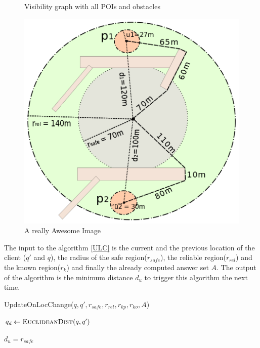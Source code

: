 \documentclass{sig-alternate}
\begin{document}
\begin{figure}[!htb]
  \caption{Visibility graph with all POIs and obstacles}\label{fig:poi_obs_path}
\endminipage\hfill
{}%
  \includegraphics[width=\linewidth]{safe_region.png}
  \caption{A really Awesome Image}\label{fig:safe_region}
\endminipage
\end{figure}


The input to the algorithm \ref{ULC} is the current and the previous location of the client ($q'$ and $q$), the radius of the safe region($r_{safe}$), the reliable region($r_{rel}$) and the known region($r_{k}$) and finally the already computed answer set $A$. The output of the algorithm is the minimum distance $d_u$ to trigger this algorithm the next time.

\begin{algorithm}
\caption{UpdateOnLocChange($q, q', r_{safe}, r_{rel}, r_{kp}, r_{ko}, A$)}
\label{ULC}

    $q_d \gets \textsc{EuclideanDist}(q, q')$
    
    
    
    \Return $d_u = r_{safe}$

\end{algorithm}
\end{document}
